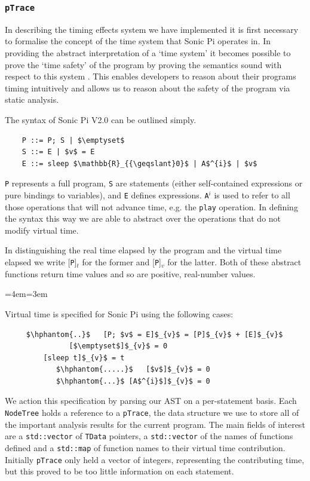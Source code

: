\documentclass[11pt, abstracton, twoside, titlepage=true]{scrartcl}
\newenvironment{blockquote}{
	\par
	\medskip
	\leftskip=4em\rightskip=3em
	\noindent\ignorespaces
}{
	\par\medskip
}
\begin{document}

\subsubsection{\texttt{pTrace}}
In describing the timing effects system we have implemented it is first necessary
to formalise the concept of the time system that Sonic Pi operates in. In providing
the abstract interpretation of a `time system' it becomes possible to prove the
`time safety' of the program by proving the semantics sound with respect to this 
system \cite{AOB14}. This enables developers to reason about their programs timing 
intuitively and allows us to reason about the safety of the program via static 
analysis.

The syntax of Sonic Pi V2.0 can be outlined simply.
\\
\begin{lstlisting}
	P ::= P; S | $\emptyset$
	S ::= E | $v$ = E
	E ::= sleep $\mathbb{R}_{{\geqslant}0}$ | A$^{i}$ | $v$
\end{lstlisting}

\texttt{P} represents a full program, 
\texttt{S} are statements (either self-contained expressions or pure bindings 
to variables), and \texttt{E} defines expressions. \texttt{A$^{i}$} is used to 
refer to all those operations that will not advance time, e.g. the 
\texttt{play} operation. In defining the syntax this way we are able to abstract 
over the operations that do not modify virtual time.

In distinguishing the real time elapsed by the program and the virtual time elapsed 
we write [\texttt{P}]$_{t}$ for the former and [\texttt{P}]$_{v}$ for the latter. 
Both of these abstract functions return time values and so are positive, 
real-number values.

\begin{blockquote}
	Virtual time is specified for Sonic Pi using the following cases:

	\begin{lstlisting}
     $\hphantom{..}$   [P; $v$ = E]$_{v}$ = [P]$_{v}$ + [E]$_{v}$
               [$\emptyset$]$_{v}$ = 0
         [sleep t]$_{v}$ = t
            $\hphantom{.....}$   [$v$]$_{v}$ = 0
            $\hphantom{...}$ [A$^{i}$]$_{v}$ = 0
	\end{lstlisting}
\end{blockquote}

We action this specification by parsing our AST on a per-statement basis. Each 
\texttt{NodeTree} holds a reference to a \texttt{pTrace}, the data structure we 
use to store all of the important analysis results for the current program. The 
main fields of interest are a \texttt{std::vector} of \texttt{TData} pointers, a
\texttt{std::vector} of the names of functions defined and a \texttt{std::map} of 
function names to their virtual time contribution. Initially \texttt{pTrace} only
held a vector of integers, representing the contributing time, but this proved to 
be too little information on each statement. 
\end{document}
